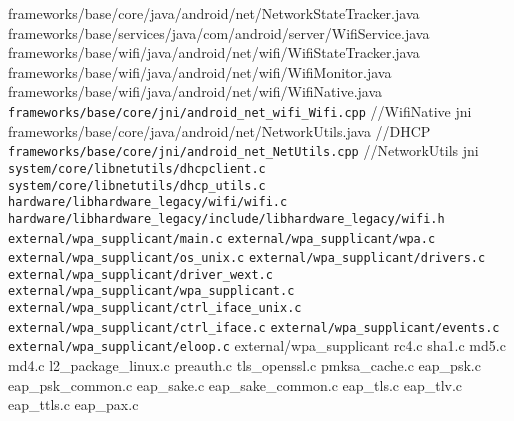 \documentclass[a4paper,11pt,]{article}%
\begin{document}
\begin{thebibliography}{源文件清单}
\bibitem { } frameworks/base/core/java/android/net/NetworkStateTracker.java   
\bibitem { } frameworks/base/services/java/com/android/server/WifiService.java      
\bibitem { } frameworks/base/wifi/java/android/net/wifi/WifiStateTracker.java
\bibitem { } frameworks/base/wifi/java/android/net/wifi/WifiMonitor.java  
\bibitem { } frameworks/base/wifi/java/android/net/wifi/WifiNative.java
\bibitem { } \verb|frameworks/base/core/jni/android_net_wifi_Wifi.cpp| //WifiNative jni
\bibitem { } frameworks/base/core/java/android/net/NetworkUtils.java //DHCP   
\bibitem { } \verb|frameworks/base/core/jni/android_net_NetUtils.cpp| //NetworkUtils jni
\bibitem { } \verb|system/core/libnetutils/dhcpclient.c|
\bibitem { } \verb|system/core/libnetutils/dhcp_utils.c|
\bibitem { } \verb|hardware/libhardware_legacy/wifi/wifi.c|
\bibitem { } \verb|hardware/libhardware_legacy/include/libhardware_legacy/wifi.h|
\bibitem { } \verb|external/wpa_supplicant/main.c|
\bibitem { } \verb|external/wpa_supplicant/wpa.c|
\bibitem { } \verb|external/wpa_supplicant/os_unix.c|
\bibitem { } \verb|external/wpa_supplicant/drivers.c|
\bibitem { } \verb|external/wpa_supplicant/driver_wext.c|
\bibitem { } \verb|external/wpa_supplicant/wpa_supplicant.c|
\bibitem { } \verb|external/wpa_supplicant/ctrl_iface_unix.c|
\bibitem { } \verb|external/wpa_supplicant/ctrl_iface.c|
\bibitem { } \verb|external/wpa_supplicant/events.c|
\bibitem { } \verb|external/wpa_supplicant/eloop.c|
\bibitem { }  external/wpa_supplicant   rc4.c sha1.c md5.c md4.c 
    l2_package_linux.c preauth.c
    tls_openssl.c pmksa_cache.c eap_psk.c eap_psk_common.c eap_sake.c
    eap_sake_common.c eap_tls.c eap_tlv.c eap_ttls.c eap_pax.c
\end{thebibliography}
\end{document}
